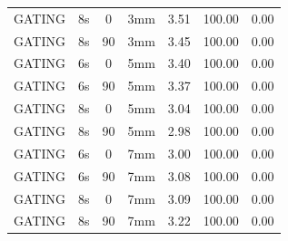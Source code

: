 \documentclass[type=dr, dr=rernat, accentcolor=tud7b,colorbacktitle, bigchapter, openright, twoside, 12pt ]{tudthesis}
\begin{document}
\begin{table}[H]
\begin{tabular}{|c||c|c|c||c|c|c|}
GATING & 8s & 0 & 3mm & 3.51 & 100.00 & 0.00 \\
GATING & 8s & 90 & 3mm & 3.45 & 100.00 & 0.00 \\
GATING & 6s & 0 & 5mm & 3.40 & 100.00 & 0.00 \\
GATING & 6s & 90 & 5mm & 3.37 & 100.00 & 0.00 \\
GATING & 8s & 0 & 5mm & 3.04 & 100.00 & 0.00 \\
GATING & 8s & 90 & 5mm & 2.98 & 100.00 & 0.00 \\
GATING & 6s & 0 & 7mm & 3.00 & 100.00 & 0.00 \\
GATING & 6s & 90 & 7mm & 3.08 & 100.00 & 0.00 \\
GATING & 8s & 0 & 7mm & 3.09 & 100.00 & 0.00 \\
GATING & 8s & 90 & 7mm & 3.22 & 100.00 & 0.00 \\
    \hline\hline 
  \end{tabular}
  \label{tab:Pat01:RPV}
\end{table}

\newpage
\end{document}

